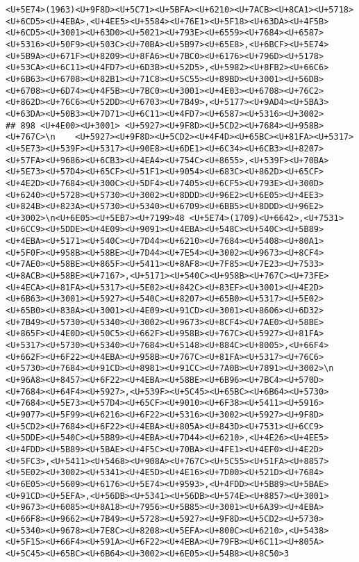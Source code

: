 \documentclass[
]{article}
\begin{document}
\begin{verbatim}
<U+5E74>(1963)<U+9F8D><U+5C71><U+5BFA><U+6210><U+7ACB><U+8CA1><U+5718><U+6CD5><U+4EBA>,<U+4EE5><U+5584><U+76E1><U+5F18><U+63DA><U+4F5B><U+6CD5><U+3001><U+63D0><U+5021><U+793E><U+6559><U+7684><U+6587><U+5316><U+50F9><U+503C><U+70BA><U+5B97><U+65E8>,<U+6BCF><U+5E74><U+5B9A><U+671F><U+8209><U+8FA6><U+7BC0><U+6176><U+796D><U+5178><U+53CA><U+6C11><U+4FD7><U+6D3B><U+52D5>,<U+5982><U+8FB2><U+66C6><U+6B63><U+6708><U+82B1><U+71C8><U+5C55><U+89BD><U+3001><U+56DB><U+6708><U+6D74><U+4F5B><U+7BC0><U+3001><U+4E03><U+6708><U+76C2><U+862D><U+76C6><U+52DD><U+6703><U+7B49>,<U+5177><U+9AD4><U+5BA3><U+63DA><U+50B3><U+7D71><U+6C11><U+4FD7><U+6587><U+5316><U+3002>
## 898 <U+4E00><U+3001> <U+5927><U+9F8D><U+5CD2><U+7684><U+958B><U+767C>\n    <U+5927><U+9F8D><U+5CD2><U+4F4D><U+65BC><U+81FA><U+5317><U+5E73><U+539F><U+5317><U+90E8><U+6DE1><U+6C34><U+6CB3><U+8207><U+57FA><U+9686><U+6CB3><U+4EA4><U+754C><U+8655>,<U+539F><U+70BA><U+5E73><U+57D4><U+65CF><U+51F1><U+9054><U+683C><U+862D><U+65CF><U+4E2D><U+7684><U+300C><U+5DF4><U+7405><U+6CF5><U+793E><U+300D><U+6240><U+5728><U+5730><U+3002><U+8DDD><U+96E2><U+6E05><U+4EE3><U+824B><U+823A><U+5730><U+5340><U+6709><U+6BB5><U+8DDD><U+96E2><U+3002>\n<U+6E05><U+5EB7><U+7199>48 <U+5E74>(1709)<U+6642>,<U+7531><U+6CC9><U+5DDE><U+4E09><U+9091><U+4EBA><U+548C><U+540C><U+5B89><U+4EBA><U+5171><U+540C><U+7D44><U+6210><U+7684><U+5408><U+80A1><U+5F0F><U+958B><U+58BE><U+7D44><U+7E54><U+3002><U+9673><U+8CF4><U+7AE0><U+58BE><U+865F><U+5411><U+8AF8><U+7F85><U+7E23><U+7533><U+8ACB><U+58BE><U+7167>,<U+5171><U+540C><U+958B><U+767C><U+73FE><U+4ECA><U+81FA><U+5317><U+5E02><U+842C><U+83EF><U+3001><U+4E2D><U+6B63><U+3001><U+5927><U+540C><U+8207><U+65B0><U+5317><U+5E02><U+65B0><U+838A><U+3001><U+4E09><U+91CD><U+3001><U+8606><U+6D32><U+7B49><U+5730><U+5340><U+3002><U+9673><U+8CF4><U+7AE0><U+58BE><U+865F><U+4E0D><U+50C5><U+662F><U+958B><U+767C><U+5927><U+81FA><U+5317><U+5730><U+5340><U+7684><U+5148><U+884C><U+8005>,<U+66F4><U+662F><U+6F22><U+4EBA><U+958B><U+767C><U+81FA><U+5317><U+76C6><U+5730><U+7684><U+91CD><U+8981><U+91CC><U+7A0B><U+7891><U+3002>\n    <U+96A8><U+8457><U+6F22><U+4EBA><U+58BE><U+6B96><U+7BC4><U+570D><U+7684><U+64F4><U+5927>,<U+539F><U+5C45><U+65BC><U+6B64><U+5730><U+7684><U+5E73><U+57D4><U+65CF><U+9010><U+6F38><U+5411><U+5916><U+9077><U+5F99><U+6216><U+6F22><U+5316><U+3002><U+5927><U+9F8D><U+5CD2><U+7684><U+6F22><U+4EBA><U+805A><U+843D><U+7531><U+6CC9><U+5DDE><U+540C><U+5B89><U+4EBA><U+7D44><U+6210>,<U+4E26><U+4EE5><U+4FDD><U+5B89><U+5BAE><U+4F5C><U+70BA><U+4FE1><U+4EF0><U+4E2D><U+5FC3>,<U+5411><U+5468><U+908A><U+767C><U+5C55><U+51FA><U+8857><U+5E02><U+3002><U+5341><U+4E5D><U+4E16><U+7D00><U+521D><U+7684><U+6E05><U+5609><U+6176><U+5E74><U+9593>,<U+4FDD><U+5B89><U+5BAE><U+91CD><U+5EFA>,<U+56DB><U+5341><U+56DB><U+574E><U+8857><U+3001><U+9673><U+6085><U+8A18><U+7956><U+5B85><U+3001><U+6A39><U+4EBA><U+66F8><U+9662><U+7B49><U+5728><U+5927><U+9F8D><U+5CD2><U+5730><U+5340><U+9678><U+7E8C><U+8208><U+5EFA><U+800C><U+6210>,<U+5438><U+5F15><U+66F4><U+591A><U+6F22><U+4EBA><U+79FB><U+6C11><U+805A><U+5C45><U+65BC><U+6B64><U+3002><U+6E05><U+54B8><U+8C50>3 
\end{verbatim}
\end{document}
